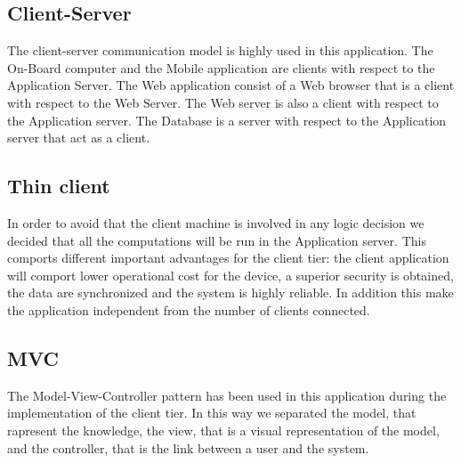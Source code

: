 \subsection{Client-Server}
	The client-server communication model is highly used in this application.
	The On-Board computer and the Mobile application are clients with respect to the Application Server. The Web application consist of a Web browser that is a client with respect to the Web Server. The Web server is also a client with respect to the Application server. The Database is a server with respect to the Application server that act as a client.
\subsection{Thin client}
	In order to avoid that the client machine is involved in any logic decision we decided that all the computations will be run in the Application server. This comports different important advantages for the client tier: the client application will comport lower operational cost for the device, a superior security is obtained, the data are synchronized and the system is highly reliable. In addition this make the application independent from the number of clients connected.
\subsection{MVC}
	The Model-View-Controller pattern has been used in this application during the implementation of the client tier. In this way we separated the model, that rapresent the knowledge, the view, that is a visual representation of the model, and the controller, that is the link between a user and the system.
